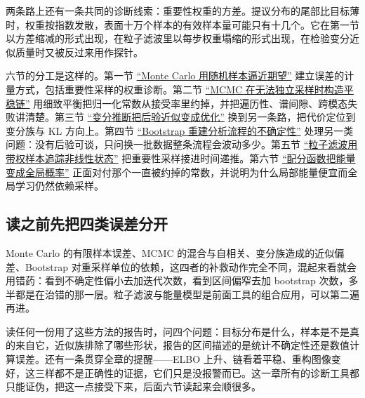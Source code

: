 两条路上还有一条共同的诊断线索：重要性权重的方差。提议分布的尾部比目标薄时，权重按指数发散，表面十万个样本的有效样本量可能只有十几个。它在第一节以方差缩减的形式出现，在粒子滤波里以每步权重塌缩的形式出现，在检验变分近似质量时又被反过来用作探针。

六节的分工是这样的。第一节 \hyperref[sec:13-Machine-Learning/08-Sampling-and-Inference/01]{``Monte Carlo 用随机样本逼近期望''} 建立误差的计量方式，包括重要性采样的权重诊断。第二节 \hyperref[sec:13-Machine-Learning/08-Sampling-and-Inference/02]{``MCMC 在无法独立采样时构造平稳链''} 用细致平衡把归一化常数从接受率里约掉，并把遍历性、谱间隙、跨模态失败讲清楚。第三节 \hyperref[sec:13-Machine-Learning/08-Sampling-and-Inference/03]{``变分推断把后验近似变成优化''} 换到另一条路，把代价定位到变分族与 KL 方向上。第四节 \hyperref[sec:13-Machine-Learning/08-Sampling-and-Inference/04]{``Bootstrap 重建分析流程的不确定性''} 处理另一类问题：没有后验可谈，只问换一批数据整条流程会波动多少。第五节 \hyperref[sec:13-Machine-Learning/08-Sampling-and-Inference/05]{``粒子滤波用带权样本追踪非线性状态''} 把重要性采样接进时间递推。第六节 \hyperref[sec:13-Machine-Learning/08-Sampling-and-Inference/06]{``配分函数把能量变成全局概率''} 正面对付那个一直被约掉的常数，并说明为什么局部能量便宜而全局学习仍然依赖采样。

\subsection{读之前先把四类误差分开}

Monte Carlo 的有限样本误差、MCMC 的混合与自相关、变分族造成的近似偏差、Bootstrap 对重采样单位的依赖，这四者的补救动作完全不同，混起来看就会用错药：看到不确定性偏小去加迭代次数，看到区间偏窄去加 bootstrap 次数，多半都是在治错的那一层。粒子滤波与能量模型是前面工具的组合应用，可以第二遍再进。

读任何一份用了这些方法的报告时，问四个问题：目标分布是什么，样本是不是真的来自它，近似族排除了哪些形状，报告的区间描述的是统计不确定性还是数值计算误差。还有一条贯穿全章的提醒——ELBO 上升、链看着平稳、重构图像变好，这三样都不是正确性的证据，它们只是没报警而已。这一章所有的诊断工具都只能证伪，把这一点接受下来，后面六节读起来会顺很多。
